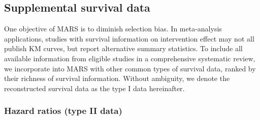 \documentclass[12pt]{article}
\theoremstyle{mystyle}
\begin{document}
\subsection{Supplemental survival data}

One objective of MARS is to diminish selection bias. In meta-analysis applications, studies with survival information on intervention effect may not all publish KM curves, but report alternative summary statistics. To include all available information from eligible studies in a comprehensive systematic review, we incorporate into MARS with other common types of survival data, ranked by their richness of survival information. Without ambiguity, we denote the reconstructed survival data as the type I data hereinafter.

\subsubsection{Hazard ratios (type II data)}
\label{subsec:3:2} 

\end{document}
